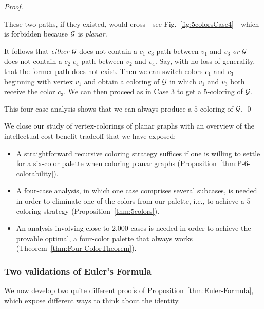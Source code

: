 \begin{proof}
\begin{itemize}
\smallskip

These two paths, if they existed, would cross---see Fig.~\ref{fig:5colorsCase4}---which is forbidden because $\mbox{$\cal G$}$ is {\em planar}.
\end{itemize}
It follows that {\em either} $\mbox{$\cal G$}$ does not contain a $c_1$-$c_3$ path between $v_1$ and $v_3$ {\em or} $\mbox{$\cal G$}$ does not contain a $c_2$-$c_4$ path between $v_2$ and $v_4$.  Say, with no loss of generality, that the former path does not exist.  Then we can switch colors $c_1$ and $c_3$ beginning with vertex $v_1$ and obtain a coloring of $\mbox{$\cal G$}$ in which $v_1$ and $v_3$ both receive the color $c_3$.  We can then proceed as in Case 3 to get a $5$-coloring of $\mbox{$\cal G$}$.

\smallskip

This four-case analysis shows that we can always produce a $5$-coloring of $\mbox{$\cal G$}$.  \qed
\end{proof}

\bigskip

We close our study of vertex-colorings of planar graphs with an overview of the intellectual cost-benefit tradeoff that we have exposed:
\begin{itemize}
\item
A straightforward recursive coloring strategy suffices if one is willing to settle for a six-color palette when coloring planar graphs (Proposition~\ref{thm:P-6-colorability}).
\medskip\item
A four-case analysis, in which one case comprises several subcases, is needed in order to eliminate one of the colors from our palette, i.e., to achieve a $5$-coloring strategy (Proposition~\ref{thm:5colors}).
\medskip\item
An analysis involving close to 2,000 cases is needed in order to achieve the provable optimal, a four-color palette that always works (Theorem~\ref{thm:Four-ColorTheorem}).
\end{itemize}

\subsubsection{Two validations of Euler's Formula}
\label{subsec:validationEulerFormula}

We now develop two quite different proofs of Proposition~\ref{thm:Euler-Formula}, which expose different ways to think about the identity.

\medskip


